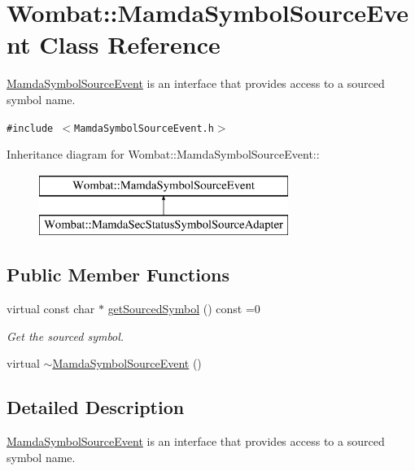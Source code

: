 \hypertarget{classWombat_1_1MamdaSymbolSourceEvent}{
\section{Wombat::Mamda\-Symbol\-Source\-Event Class Reference}
\label{classWombat_1_1MamdaSymbolSourceEvent}
}
\hyperlink{classWombat_1_1MamdaSymbolSourceEvent}{Mamda\-Symbol\-Source\-Event} is an interface that provides access to a sourced symbol name.  


{\tt \#include $<$Mamda\-Symbol\-Source\-Event.h$>$}

Inheritance diagram for Wombat::Mamda\-Symbol\-Source\-Event::\begin{figure}[H]
\begin{center}
\leavevmode
\includegraphics[height=2cm]{classWombat_1_1MamdaSymbolSourceEvent}
\end{center}
\end{figure}
\subsection*{Public Member Functions}
\begin{CompactItemize}
\item 
virtual const char $\ast$ \hyperlink{classWombat_1_1MamdaSymbolSourceEvent_f55521a5c392761f1a17d3a3a0e24411}{get\-Sourced\-Symbol} () const =0
\begin{CompactList}\small\item\em Get the sourced symbol. \item\end{CompactList}\item 
virtual \hyperlink{classWombat_1_1MamdaSymbolSourceEvent_9cf69406c29fbd16e0707951363e8c24}{$\sim$Mamda\-Symbol\-Source\-Event} ()
\end{CompactItemize}


\subsection{Detailed Description}
\hyperlink{classWombat_1_1MamdaSymbolSourceEvent}{Mamda\-Symbol\-Source\-Event} is an interface that provides access to a sourced symbol name. 



